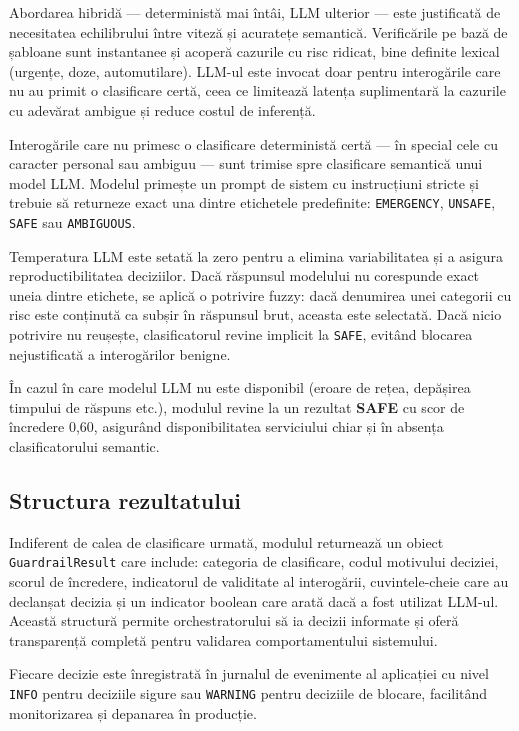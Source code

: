 \documentclass[12pt, a4paper, oneside, romanian]{teza-upb}
\begin{document}
Abordarea hibridă — deterministă mai întâi, LLM ulterior — este justificată de necesitatea echilibrului între viteză și acuratețe semantică. Verificările pe bază de șabloane sunt instantanee și acoperă cazurile cu risc ridicat, bine definite lexical (urgențe, doze, automutilare). LLM-ul este invocat doar pentru interogările care nu au primit o clasificare certă, ceea ce limitează latența suplimentară la cazurile cu adevărat ambigue și reduce costul de inferență.

Interogările care nu primesc o clasificare deterministă certă — în special cele cu caracter personal sau ambiguu — sunt trimise spre clasificare semantică unui model LLM. Modelul primește un prompt de sistem cu instrucțiuni stricte și trebuie să returneze exact una dintre etichetele predefinite: \texttt{EMERGENCY}, \texttt{UNSAFE}, \texttt{SAFE} sau \texttt{AMBIGUOUS}.

Temperatura LLM este setată la zero pentru a elimina variabilitatea și a asigura reproductibilitatea deciziilor. Dacă răspunsul modelului nu corespunde exact uneia dintre etichete, se aplică o potrivire fuzzy: dacă denumirea unei categorii cu risc este conținută ca subșir în răspunsul brut, aceasta este selectată. Dacă nicio potrivire nu reușește, clasificatorul revine implicit la \texttt{SAFE}, evitând blocarea nejustificată a interogărilor benigne.

În cazul în care modelul LLM nu este disponibil (eroare de rețea, depășirea timpului de răspuns etc.), modulul revine la un rezultat \textbf{SAFE} cu scor de încredere 0,60, asigurând disponibilitatea serviciului chiar și în absența clasificatorului semantic.

\subsection{Structura rezultatului}

Indiferent de calea de clasificare urmată, modulul returnează un obiect \texttt{GuardrailResult} care include: categoria de clasificare, codul motivului deciziei, scorul de încredere, indicatorul de validitate al interogării, cuvintele-cheie care au declanșat decizia și un indicator boolean care arată dacă a fost utilizat LLM-ul. Această structură permite orchestratorului să ia decizii informate și oferă transparență completă pentru validarea comportamentului sistemului.


Fiecare decizie este înregistrată în jurnalul de evenimente al aplicației cu nivel \texttt{INFO} pentru deciziile sigure sau \texttt{WARNING} pentru deciziile de blocare, facilitând monitorizarea și depanarea în producție.
\end{document}
